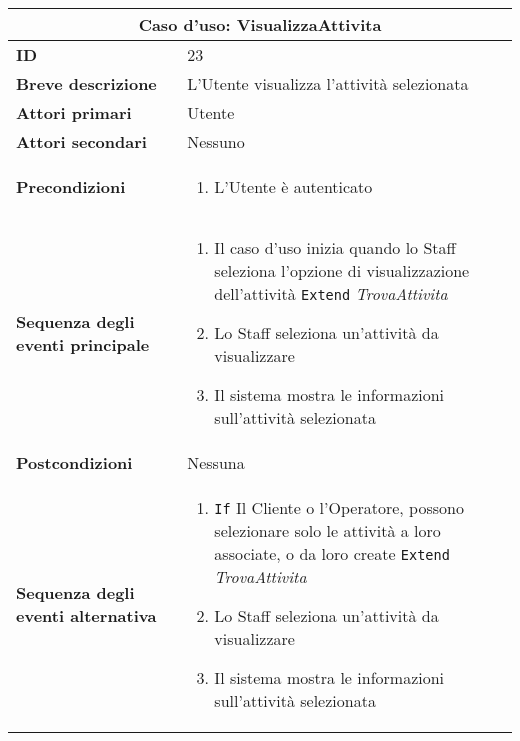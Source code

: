 \documentclass[a4paper]{report}
\begin{document}
\clearpage
\begin{table}[H]
\vspace*{-0cm}
\renewcommand{\arraystretch}{1.9}
\begin{tabular}{|p{3.9cm}|p{9.9cm}|}
\hline
\multicolumn{2}{|c|}{\textbf{Caso d’uso: VisualizzaAttivita}} \\ \hline
	\textbf{ID} & 23 \\ \hline
	\textbf{Breve descrizione} & L'Utente visualizza l’attività selezionata \\ \hline
	\textbf{Attori primari} & Utente \\ \hline
	\textbf{Attori secondari} & Nessuno \\ \hline
	\textbf{Precondizioni} & \begin{enumerate}[leftmargin=14pt,label=\arabic*.,labelsep=0.5em,topsep=0pt,partopsep=0pt,parsep=0pt,itemsep=0pt]
    \item L'Utente è autenticato
\end{enumerate} \\ \hline
	\textbf{Sequenza degli eventi principale} & \begin{enumerate}[leftmargin=14pt,label=\arabic*.,labelsep=0.5em,topsep=0pt,partopsep=0pt,parsep=0pt,itemsep=0pt]
    \item Il caso d’uso inizia quando lo Staff seleziona l’opzione di visualizzazione  dell'attività
    \newline \texttt{Extend} \textit{TrovaAttivita}
    \item Lo Staff seleziona un’attività da visualizzare
    \item Il sistema mostra le informazioni sull’attività selezionata
\end{enumerate} \\ \hline
	\textbf{Postcondizioni} & Nessuna \\ \hline
\textbf{Sequenza degli eventi alternativa} & \begin{enumerate}[leftmargin=14pt,label=\arabic*.,labelsep=0.5em,topsep=0pt,partopsep=0pt,parsep=0pt,itemsep=0pt]
    \item \texttt{If} Il Cliente o l'Operatore, possono selezionare solo le attività a loro associate, o da loro create 
    \newline \texttt{Extend} \textit{TrovaAttivita}
    \item Lo Staff seleziona un’attività da visualizzare
    \item Il sistema mostra le informazioni sull’attività selezionata
\end{enumerate} \\ \hline
\end{tabular}
\end{table}
\end{document}
